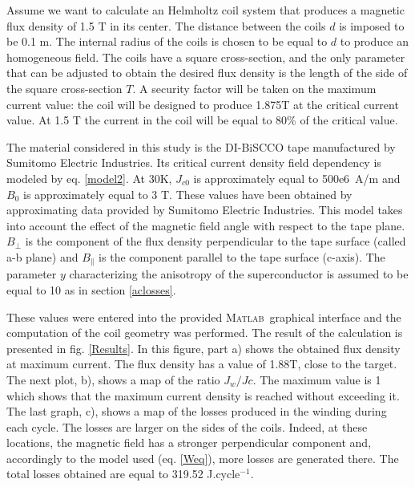 \documentclass{ws-jmrr}
\newcommand{\MATLAB}{\textsc{Matlab}}
\begin{document}
\begin{multicols}{2}
Assume we want to calculate an Helmholtz coil system that produces a magnetic flux density of 1.5 T in its center. The
distance between the coils $d$ is imposed to be 0.1 m. The internal radius of the coils is chosen to be equal to $d$ to produce an homogeneous field. The coils have a square cross-section, and the only parameter that can be adjusted to obtain the desired flux density is the length of the side of the square cross-section $T$. A security factor will be taken on the maximum current value: the coil will be designed to produce 1.875T at the critical current value. At 1.5 T the current in the coil will be equal to 80\% of the critical value.\par
The material considered in this study is the DI-BiSCCO tape manufactured by Sumitomo Electric Industries. Its critical current density field dependency is modeled by eq. \ref{model2}. At 30K, $J_{c0}$ is approximately equal to 500e6~A/m and $B_0$ is approximately equal to 3 T. These values have been obtained by approximating data provided by Sumitomo Electric Industries. This model takes into account the effect of the magnetic field angle with respect to the tape plane. $B_{\perp}$ is the component of the flux density perpendicular to the tape surface (called a-b plane) and $B_{\parallel}$ is the component parallel to the tape surface (c-axis). The parameter $y$ characterizing the anisotropy of the superconductor is assumed to be equal to 10 as in section \ref{aclosses}.\par
These values were entered into the provided \MATLAB ~graphical interface and the computation of the coil geometry was performed. The result of the calculation is presented in fig. \ref{Results}. In this figure, part a) shows the obtained flux density at maximum current. The flux density has a value of 1.88T, close to the target. The next plot, b), shows a map of the ratio $J_w/Jc$. The maximum value is 1 which shows that the maximum current density is reached without exceeding it. The last graph, c), shows a map of the losses produced in the winding during each cycle. The losses are larger on the sides of the coils. Indeed, at these locations, the magnetic field has a stronger perpendicular component and, accordingly to the model used (eq. \ref{Weq}), more losses are generated there. The total losses obtained are equal to 319.52 J.cycle$^{-1}$.

\end{multicols}
\end{document}
